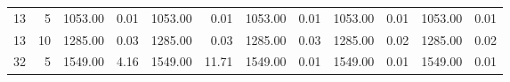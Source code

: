 \begin{table}
\begin{tabular}{@{}rrrrrrrrrrrr@{}}
13                                                                               & 5                                                                                     & 1053.00                                                                     & 0.01                                                                   & 1053.00                                                                     & 0.01                                                                    & 1053.00                                                                     & 0.01                                                                   & 1053.00                                                                     & 0.01                                                                   & 1053.00                                                                     & 0.01                                                                   \\
13                                                                               & 10                                                                                    & 1285.00                                                                     & 0.03                                                                   & 1285.00                                                                     & 0.03                                                                    & 1285.00                                                                     & 0.03                                                                   & 1285.00                                                                     & 0.02                                                                   & 1285.00                                                                     & 0.02                                                                   \\
32                                                                               & 5                                                                                     & 1549.00                                                                     & 4.16                                                                   & 1549.00                                                                     & 11.71                                                                   & 1549.00                                                                     & 0.01                                                                   & 1549.00                                                                     & 0.01                                                                   & 1549.00                                                                     & 0.01                                                                   \\

\end{tabular}
\end{table}
